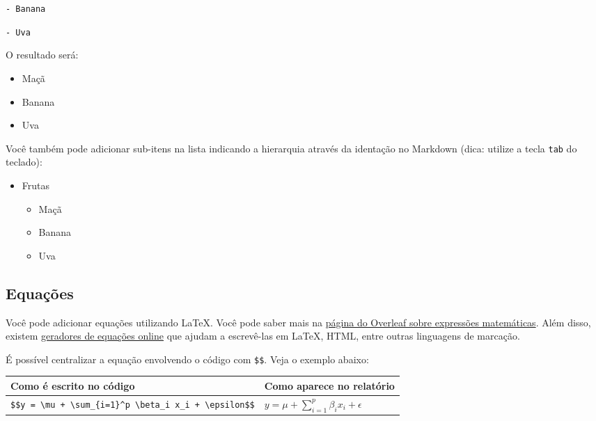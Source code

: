 \documentclass[
]{book}
\providecommand{\tightlist}{%
  \setlength{\itemsep}{0pt}\setlength{\parskip}{0pt}}
\begin{document}
\texttt{-\ Banana}

\texttt{-\ Uva}

O resultado será:

\begin{itemize}
\tightlist
\item
  Maçã
\item
  Banana
\item
  Uva
\end{itemize}

Você também pode adicionar sub-itens na lista indicando a hierarquia através da identação no Markdown (dica: utilize a tecla \texttt{tab} do teclado):

\begin{itemize}
\tightlist
\item
  Frutas

  \begin{itemize}
  \tightlist
  \item
    Maçã
  \item
    Banana
  \item
    Uva
  \end{itemize}
\end{itemize}

\subsection{Equações}\label{equauxe7uxf5es}

Você pode adicionar equações utilizando LaTeX. Você pode saber mais na \href{https://pt.overleaf.com/learn/latex/Mathematical_expressions}{página do Overleaf sobre expressões matemáticas}. Além disso, existem \href{https://www.codecogs.com/latex/eqneditor.php}{geradores de equações online} que ajudam a escrevê-las em LaTeX, HTML, entre outras linguagens de marcação.

É possível centralizar a equação envolvendo o código com \texttt{\$\$}. Veja o exemplo abaixo:

\begin{longtable}[]{@{}
  >{\raggedright\arraybackslash}p{}
  >{\raggedright\arraybackslash}p{}@{}}
\toprule\noalign{}
\begin{minipage}[b]{\linewidth}\raggedright
Como é escrito no código
\end{minipage} & \begin{minipage}[b]{\linewidth}\raggedright
Como aparece no relatório
\end{minipage} \\
\midrule\noalign{}
\endhead
\bottomrule\noalign{}
\endlastfoot
\texttt{\$\$y\ =\ \textbackslash{}mu\ +\ \textbackslash{}sum\_\{i=1\}\^{}p\ \textbackslash{}beta\_i\ x\_i\ +\ \textbackslash{}epsilon\$\$} & \(y = \mu + \sum_{i=1}^p \beta_i x_i + \epsilon\) \\
\end{longtable}
\end{document}
